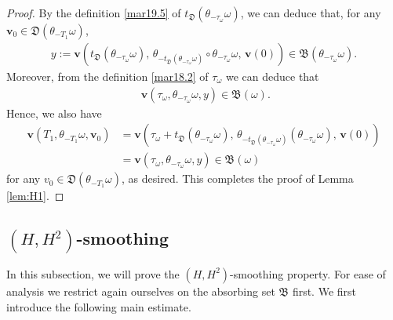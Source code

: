 \documentclass{elsarticle}
\theoremstyle{definition}
\numberwithin{equation}{section}
\begin{document}
\begin{proof}
By the definition \eqref{mar19.5}  of $ t_{\mathfrak D}(\theta_{-\tau_\omega} \omega)$, we can deduce that, for any $\textbf{v}_0\in \mathfrak D(\theta_{-T_1}\omega) $,
 \begin{align*}
 y:= \textbf{v} \left(    t_{\mathfrak D}(\theta_{-\tau_\omega} \omega)   , \, \theta_{- t_{\mathfrak D}(\theta_{-\tau_\omega} \omega)} \circ \theta_{-\tau_\omega}
 \omega, \,  \textbf{v}(0)\right) \in \mathfrak B(\theta_{-\tau_\omega}\omega).
\end{align*}
Moreover, from the definition \eqref{mar18.2}  of $\tau_\omega$ we can deduce that
\begin{align*}
\textbf{ v}(\tau_\omega, \theta_{-\tau_\omega} \omega, y) \in \mathfrak B(\omega).
\end{align*}
Hence, we also have
\begin{align*}
    \textbf{v}\left (T_1 ,\theta_{-T_1}\omega,  \textbf{v}_{0}\right)
    & =  \textbf{v} \left( \tau_\omega+   t_{\mathfrak D}(\theta_{-\tau_\omega} \omega)   , \, \theta_{- t_{\mathfrak D}(\theta_{-\tau_\omega} \omega)}(\theta_{-\tau_\omega}
 \omega), \,  \textbf{v}(0)\right)\\
 &= \textbf{v}(\tau_\omega, \theta_{-\tau_\omega} \omega, y)
  \in \mathfrak B(\omega)
\end{align*}
 for any $v_0\in \mathfrak D(\theta_{-T_1}\omega) $, as desired. This completes the proof of Lemma \ref{lem:H1}.
 \end{proof}


\subsection{$(H , H^2)$-smoothing}

In this subsection, we will prove the $(H , H^2)$-smoothing property. For ease of analysis we  restrict again ourselves on the absorbing set $\mathfrak B $ first. We  first introduce  the following main estimate.
\end{document}
